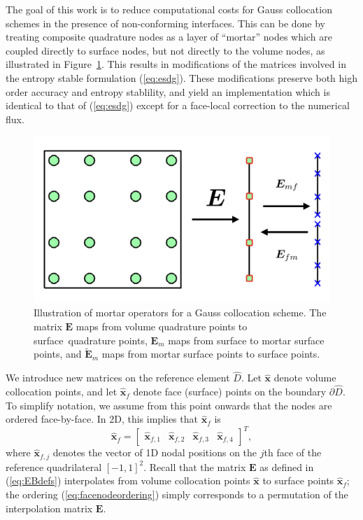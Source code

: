 \documentclass{svjour3}                     %
\renewcommand{\hat}{\widehat}
\renewcommand{\tilde}{\widetilde}
\begin{document}
The goal of this work is to reduce computational costs for Gauss collocation schemes in the presence of non-conforming interfaces.  This can be done by treating composite quadrature nodes as a layer of ``mortar'' nodes which are coupled directly to surface nodes, but not directly to the volume nodes, as illustrated in Figure~\ref{fig:gqcon_noncon}.  This results in modifications of the matrices involved in the entropy stable formulation (\ref{eq:esdg}).  These modifications preserve both high order accuracy and entropy stablility, and yield an implementation which is identical to that of (\ref{eq:esdg}) except for a face-local correction to the numerical flux.  
\begin{figure}
\centering
\includegraphics[width=.6\textwidth]{figs/mortar.png}
\caption{Illustration of mortar operators for a Gauss collocation scheme.  The matrix $\bm{E}$ maps from volume quadrature points to surface quadrature points, $\bm{E}_m$ maps from surface to mortar surface points, and $\tilde{\bm{E}}_m$ maps from mortar surface points to surface points. }
\label{fig:gqcon_noncon}
\end{figure}

We introduce new matrices on the reference element $\hat{D}$.  Let $\hat{\bm{x}}$ denote volume collocation points, and let $\hat{\bm{x}}_f$ denote face (surface) points on the boundary $\partial \hat{D}$.  To simplify notation, we assume from this point onwards that the nodes are ordered face-by-face.  In 2D, this implies that $\hat{\bm{x}}_f$ is 
\begin{equation}
\hat{\bm{x}}_f = \begin{bmatrix}
\hat{\bm{x}}_{f,1} &
\hat{\bm{x}}_{f,2} &
\hat{\bm{x}}_{f,3} &
\hat{\bm{x}}_{f,4}
\end{bmatrix}^T,
\label{eq:facenodeordering}
\end{equation}
where $\hat{\bm{x}}_{f,j}$ denotes the vector of 1D nodal positions on the $j$th face of the reference quadrilateral $[-1,1]^2$.  Recall that the matrix $\bm{E}$ as defined in (\ref{eq:EBdefs}) interpolates from volume collocation points $\hat{\bm{x}}$ to surface points $\hat{\bm{x}}_f$; the ordering (\ref{eq:facenodeordering}) simply corresponds to a permutation of the interpolation matrix $\bm{E}$.  
\end{document}
